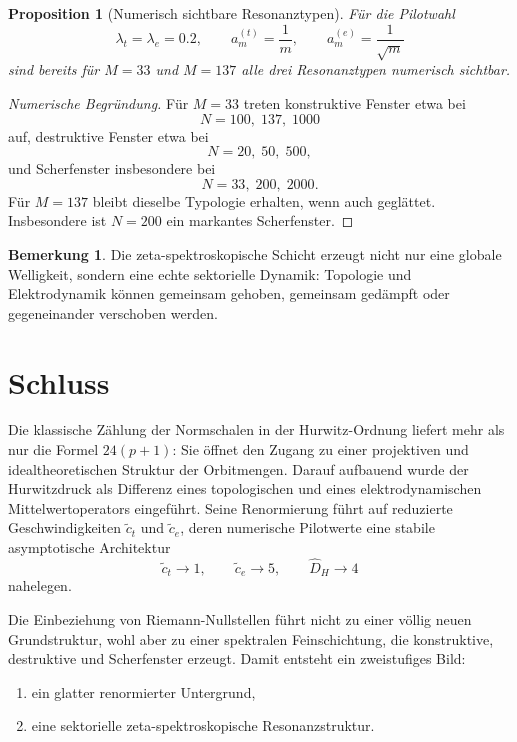 \documentclass[a4paper,12pt]{article}
\newtheorem{proposition}[satz]{Proposition}
\theoremstyle{definition}
\newtheorem{bemerkung}[satz]{Bemerkung}
\numberwithin{equation}{section}
\begin{document}
	\begin{proposition}[Numerisch sichtbare Resonanztypen]
		Für die Pilotwahl
		\[
		\lambda_t=\lambda_e=0.2,\qquad
		a_m^{(t)}=\frac1m,\qquad
		a_m^{(e)}=\frac1{\sqrt m}
		\]
		sind bereits für \(M=33\) und \(M=137\) alle drei Resonanztypen numerisch sichtbar.
	\end{proposition}
	
	\begin{proof}[Numerische Begründung]
		Für \(M=33\) treten konstruktive Fenster etwa bei
		\[
		N=100,\;137,\;1000
		\]
		auf, destruktive Fenster etwa bei
		\[
		N=20,\;50,\;500,
		\]
		und Scherfenster insbesondere bei
		\[
		N=33,\;200,\;2000.
		\]
		Für \(M=137\) bleibt dieselbe Typologie erhalten, wenn auch geglättet. Insbesondere ist \(N=200\) ein markantes Scherfenster.
	\end{proof}
	
	\begin{bemerkung}
		Die zeta-spektroskopische Schicht erzeugt nicht nur eine globale Welligkeit, sondern eine echte sektorielle Dynamik: Topologie und Elektrodynamik können gemeinsam gehoben, gemeinsam gedämpft oder gegeneinander verschoben werden.
	\end{bemerkung}
	
	\section{Schluss}
	
	Die klassische Zählung der Normschalen in der Hurwitz-Ordnung liefert mehr als nur die Formel \(24(p+1)\): Sie öffnet den Zugang zu einer projektiven und idealtheoretischen Struktur der Orbitmengen. Darauf aufbauend wurde der Hurwitzdruck als Differenz eines topologischen und eines elektrodynamischen Mittelwertoperators eingeführt. Seine Renormierung führt auf reduzierte Geschwindigkeiten \(\tilde c_t\) und \(\tilde c_e\), deren numerische Pilotwerte eine stabile asymptotische Architektur
	\[
	\tilde c_t\to 1,\qquad
	\tilde c_e\to 5,\qquad
	\widehat D_H\to 4
	\]
	nahelegen.
	
	Die Einbeziehung von Riemann-Nullstellen führt nicht zu einer völlig neuen Grundstruktur, wohl aber zu einer spektralen Feinschichtung, die konstruktive, destruktive und Scherfenster erzeugt. Damit entsteht ein zweistufiges Bild:
	
	\begin{enumerate}
		\item ein glatter renormierter Untergrund,
		\item eine sektorielle zeta-spektroskopische Resonanzstruktur.
	\end{enumerate}
	
\end{document}
